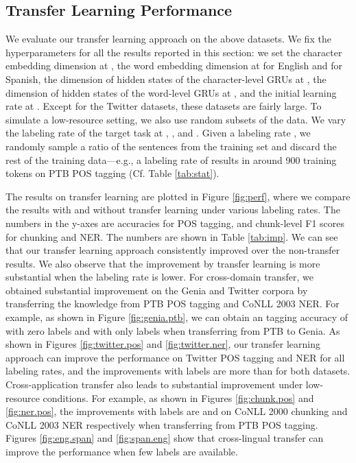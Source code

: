 \documentclass{article} \usepackage{iclr2017_conference,times}
\begin{document}
\subsection{Transfer Learning Performance} \label{sec:transfer}

We evaluate our transfer learning approach on the above datasets. We fix the hyperparameters for all the results reported in this section: we set the character embedding dimension at , the word embedding dimension at  for English and  for Spanish, the dimension of hidden states of the character-level GRUs at , the dimension of hidden states of the word-level GRUs at , and the initial learning rate at . Except for the Twitter datasets, these datasets are fairly large.  To simulate a low-resource setting, we also use random subsets of the data. We vary the labeling rate of the target task at , ,  and . Given a labeling rate , we randomly sample a ratio  of the sentences from the training set and discard the rest of the training data---e.g., a labeling rate of  results in around 900 training tokens on PTB POS tagging (Cf. Table \ref{tab:stat}).

The results on transfer learning are plotted in Figure \ref{fig:perf}, where we compare the results with and without transfer learning under various labeling rates. The numbers in the y-axes are accuracies for POS tagging, and chunk-level F1 scores for chunking and NER. The numbers are shown in Table \ref{tab:imp}. We can see that our transfer learning approach consistently improved over the non-transfer results. We also observe that the improvement by transfer learning is more substantial when the labeling rate is lower. For cross-domain transfer, we obtained substantial improvement on the Genia and Twitter corpora by transferring the knowledge from PTB POS tagging and CoNLL 2003 NER. For example, as shown in Figure \ref{fig:genia.ptb}, we can obtain an tagging accuracy of  with zero labels and  with only  labels when transferring from PTB to Genia. As shown in Figures \ref{fig:twitter.pos} and \ref{fig:twitter.ner}, our transfer learning approach can improve the performance on Twitter POS tagging and NER for all labeling rates, and the improvements with  labels are more than  for both datasets. Cross-application transfer also leads to substantial improvement under low-resource conditions. For example, as shown in Figures \ref{fig:chunk.pos} and \ref{fig:ner.pos}, the improvements with  labels are  and  on CoNLL 2000 chunking and CoNLL 2003 NER respectively when transferring from PTB POS tagging. Figures \ref{fig:eng.span} and \ref{fig:span.eng} show that cross-lingual transfer can improve the performance when few labels are available.
\end{document}
